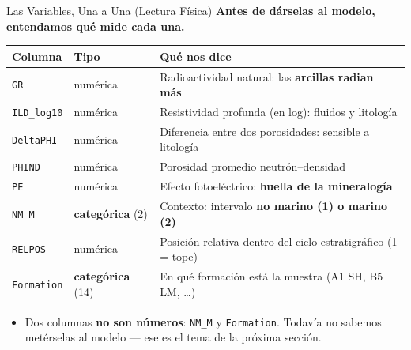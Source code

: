 \documentclass[aspectratio=169, 11pt]{beamer}
\begin{document}
\begin{frame}[shrink=12]{Las Variables, Una a Una (Lectura Física)}
  \vspace{-4pt}
  {\small\color{arcaDark}\bfseries
    Antes de dárselas al modelo, entendamos qué mide cada una.}

  \vspace{6pt}
  {\footnotesize
  \begin{tabular}{@{}llp{7.6cm}@{}}
    \toprule
    {\color{arcaDark}\bfseries Columna} & {\color{arcaDark}\bfseries Tipo} &
    {\color{arcaDark}\bfseries Qué nos dice} \\
    \midrule
    \texttt{GR} & numérica & Radioactividad natural: las \textbf{arcillas radian más} \\
    \texttt{ILD\_log10} & numérica & Resistividad profunda (en log): fluidos y litología \\
    \texttt{DeltaPHI} & numérica & Diferencia entre dos porosidades: sensible a litología \\
    \texttt{PHIND} & numérica & Porosidad promedio neutrón--densidad \\
    \texttt{PE} & numérica & Efecto fotoeléctrico: \textbf{huella de la mineralogía} \\
    \texttt{NM\_M} & \textbf{categórica} (2) & Contexto: intervalo \textbf{no marino (1) o marino (2)} \\
    \texttt{RELPOS} & numérica & Posición relativa dentro del ciclo estratigráfico (1 = tope) \\
    \texttt{Formation} & \textbf{categórica} (14) & En qué formación está la muestra (A1 SH, B5 LM, \ldots) \\
    \bottomrule
  \end{tabular}
  }

  \vspace{6pt}
  {\scriptsize\color{textMuted}
  \begin{itemize}\setlength{\itemsep}{2pt}
    \item[{\color{arcaRed}\scriptsize\faExclamationTriangle}]
      Dos columnas \textbf{no son números}: \texttt{NM\_M} y \texttt{Formation}.
      Todavía no sabemos metérselas al modelo --- ese es el tema de la próxima sección.
  \end{itemize}
  }
\end{frame}
\end{document}
